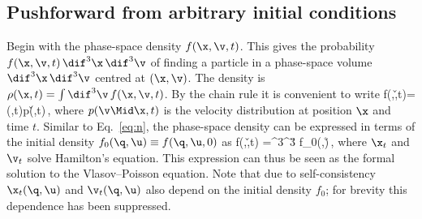 \subsection{Pushforward from arbitrary initial conditions}
\noindent Begin with the phase-space density $f(\x,\v,t)$. This
gives the probability $f(\x,\v,t)\,\dif^3\x\,\dif^3\v$
of finding a particle in a phase-space volume $\dif^3\x\,\dif^3\v$ 
centred at $(\x,\v)$.
The density is $\rho(\x,t)=\int\dif^3\v\, f(\x,\v,t)$.
By the chain rule it is convenient to write
\be\label{eq:f-chain}
f(\x,\v,t)=\rho(\x,t)\sp p(\v\Mid\x,t)\,,
\ee
where $p(\v\Mid\x,t)$ is the velocity distribution
at position $\x$ and time $t$.
Similar to Eq.~\eqref{eq:n}, the phase-space density can be expressed in
terms of the initial density $f_0(\q,\u)\equiv f(\q,\u,0)$ as
\be\nonumber %
f(\x,\v,t)
=\int\dif^3{\q}\int\dif^3{\u}\;
\delD\big[\x-\x_t(\q,\u)\big]\ssp
\delD\big[\v-\v_t(\q,\u)\big]\ssp f_0(\q,\u)\,,
\ee
where $\x_t$ and $\v_t$ solve Hamilton's equation.
This expression can thus be seen as the formal solution to
the Vlasov--Poisson equation.
Note that due to self-consistency $\x_t(\q,\u)$ and $\v_t(\q,\u)$
also depend on the initial density $f_0$; for brevity
this dependence has been suppressed.
